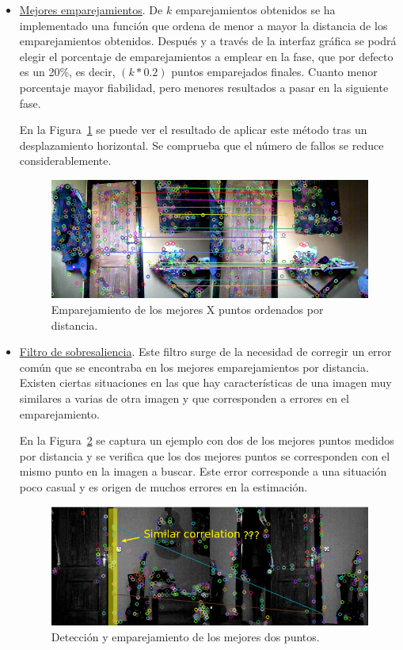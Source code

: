 \begin{itemize}
\item \underline{Mejores emparejamientos}. De $k$ emparejamientos obtenidos se ha implementado una función que ordena de menor a mayor la distancia de los emparejamientos obtenidos. Después y a través de la interfaz gráfica se podrá elegir el porcentaje de emparejamientos a emplear en la fase, que por defecto es un 20\%, es decir, $(k*0.2)$ puntos emparejados finales. Cuanto menor porcentaje mayor fiabilidad, pero menores resultados a pasar en la siguiente fase.

En la Figura~\ref{fig:bestPointsSift} se puede ver el resultado de aplicar este método tras un desplazamiento horizontal. Se comprueba que el número de fallos se reduce considerablemente.

\begin{figure}[th]
\centering
\includegraphics[scale=0.6]{Figures/best_points_sift.png}
\decoRule
\caption[Captura de los mejores puntos con SIFT]{Emparejamiento de los mejores X puntos ordenados por distancia.}
\label{fig:bestPointsSift}
\end{figure}

\item \underline{Filtro de sobresaliencia}. Este filtro surge de la necesidad de corregir un error común que se encontraba en los mejores emparejamientos por distancia. Existen ciertas situaciones en las que hay características de una imagen muy similares a varias de otra imagen y que corresponden a errores en el emparejamiento.

En la Figura~\ref{fig:similarCorrelation} se captura un ejemplo con dos de los mejores puntos medidos por distancia y se verifica que los dos mejores puntos se corresponden con el mismo punto en la imagen a buscar. Este error corresponde a una situación poco casual y es origen de muchos errores en la estimación.

\begin{figure}[th]
\centering
\includegraphics[scale=0.6]{Figures/similar-correlation.png}
\decoRule
\caption[Captura con error de los dos mejores puntos en SIFT]{Detección y emparejamiento de los mejores dos puntos.}
\label{fig:similarCorrelation}
\end{figure}


\end{itemize}
